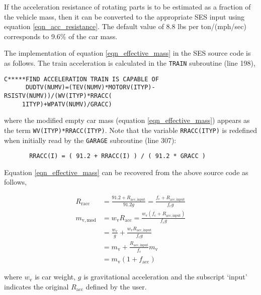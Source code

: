 \documentclass[11pt]{article} %
\begin{document}
If the acceleration resistance of rotating parts is to be estimated as a fraction of the vehicle mass, then it can be converted to the appropriate SES input using equation \ref{eqn_acc_resistance}.
The default value of 8.8 lbs per ton/(mph/sec) corresponds to 9.6\% of the car mass. 

The implementation of equation \ref{eqn_effective_mass} in the SES source code is as follows.
The train acceleration is calculated in the {\tt TRAIN} subroutine (line 198), 

\begin{lstlisting}
C*****FIND ACCELERATION TRAIN IS CAPABLE OF                             
      DUDTV(NUMV)=(TEV(NUMV)*MOTORV(ITYP)-RSISTV(NUMV))/(WV(ITYP)*RRACC(
     1ITYP)+WPATV(NUMV)/GRACC) 
\end{lstlisting}

\noindent where the modified empty car mass (equation \ref{eqn_effective_mass}) appears as the term {\tt WV(ITYP)*RRACC(ITYP)}.
Note that the variable {\tt RRACC(ITYP)} is redefined when initially read by the {\tt GARAGE} subroutine (line 307):

\begin{lstlisting}
       RRACC(I) = ( 91.2 + RRACC(I) ) / ( 91.2 * GRACC )               
\end{lstlisting}

Equation \ref{eqn_effective_mass} can be recovered from the above source code as follows,

\begin{align*}
R_\mathrm{racc} &= \frac{91.2 + R_\mathrm{acc,input}}{91.2 g} = \frac{f_\mathrm{c} + R_\mathrm{acc,input}}{f_\mathrm{c} g} \\
m_{\mathrm{v,mod}} &= w_\mathrm{v} R_\mathrm{acc} = \frac{w_\mathrm{v} ( f_\mathrm{c} + R_\mathrm{acc,input} ) }{f_\mathrm{c} g} \\
 &= \frac{w_\mathrm{v}}{g} +  \frac{ w_\mathrm{v} R_\mathrm{acc,input}  }{f_\mathrm{c} g} \\
 &= m_\mathrm{v} +  \frac{ R_\mathrm{acc,input}  }{f_\mathrm{c}} m_\mathrm{v} \\
 &= m_\mathrm{v} \left(1 + f_\mathrm{acc}\right)
\end{align*}

\noindent where $w_\mathrm{v}$ is car weight, $g$ is gravitational acceleration and the subscript `input' indicates the original $R_\mathrm{acc}$ defined by the user.
\end{document}
